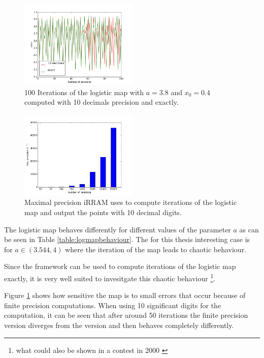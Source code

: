     \begin{figure}\label{fig:logmaperror1}
    \centering
    \includegraphics[width=0.5\textwidth]{img/dynamic_systems/logmap1}
    \caption{100 Iterations of the logistic map with $a=3.8$ and $x_0 = 0.4$ computed with 10 decimals precision and exactly.}
    \end{figure}
    \begin{figure}\label{fig:logmapprec}
    \centering
    \includegraphics[width=0.5\textwidth]{img/dynamic_systems/logmap2}
    \caption{Maximal precision iRRAM uses to compute iterations of the logistic map and output the points with 10 decimal digits.}
  \end{figure}
  The logistic map behaves differently for different values of the parameter $a$ as can be seen in Table \ref{table:logmapbehaviour}. 
  The for this thesis interesting case is for $a \in (3.544, 4)$ where the iteration of the map leads to chaotic behaviour.

  Since the \irram framework can be used to compute iterations of the logistic map exactly, it is very well suited to invesitgate this chaotic behaviour \footnote{what could also be shown in a contest in 2000 \cite{competition:2001}}. 

  Figure \ref{fig:logmaperror1} shows how sensitive the map is to small errors that occur because of finite precision computations. 
  When using 10 significant digits for the computation, it can be seen that after around 50 iterations the finite precision version diverges from the \irram version and then behaves completely differently. 


